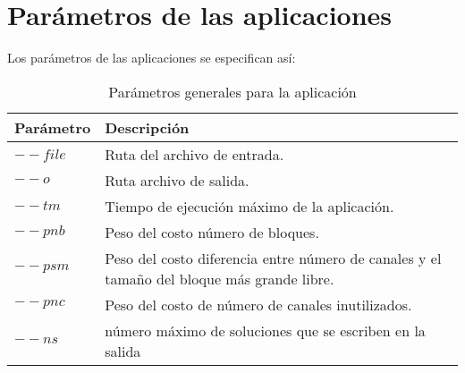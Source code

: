 \section{Parámetros de las aplicaciones}

Los parámetros de las aplicaciones se especifican así:

\begin{center}
\begin{longtable}{|p{4cm}|p{11cm}|}
	\caption{Parámetros generales para la aplicación}\\
	\hline
	\cellcolor[gray]{0.9} \textbf{Parámetro} & \cellcolor[gray]{0.9}\textbf{Descripción} \\
	\hline
	$--file$ & Ruta del archivo de entrada.\\
	\hline
	$--o$ & Ruta archivo de salida.\\
	\hline
	$--tm$ & Tiempo de ejecución máximo de la aplicación.\\
	\hline
	$--pnb$ & Peso del costo número de bloques.\\
	\hline
	$--psm$ & Peso del costo diferencia entre número de canales y el tamaño del bloque más grande libre.\\
	\hline
	$--pnc$ & Peso del costo de número de canales inutilizados.\\
	\hline
	$--ns$ & número máximo de soluciones que se escriben en la salida \\
	\hline
\end{longtable}	
\end{center}

